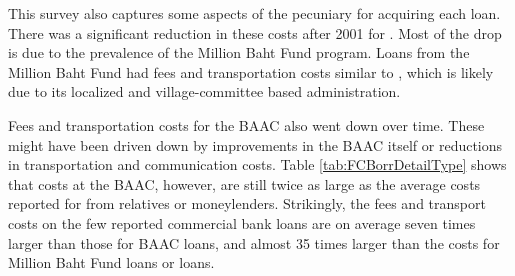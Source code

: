 \label{subsec:dataone}

This survey also captures some aspects of the pecuniary \FCFs for acquiring each loan. There was a significant reduction in these costs after 2001 for \NLC \BBBB. Most of the drop is due to the prevalence of the Million Baht Fund program. Loans from the Million Baht Fund had fees and transportation costs similar to \BBBB \LLCLY, which is likely due to its localized and village-committee based administration.

Fees and transportation costs for the BAAC also went down over time. These might have been driven down by improvements in the BAAC itself or reductions in transportation and communication costs. Table \ref{tab:FCBorrDetailType} shows that costs at the BAAC, however, are still twice as large as the average costs reported for \BBBB from relatives or moneylenders. Strikingly, the fees and transport costs on the few reported commercial bank loans are on average seven times larger than those for BAAC loans, and almost 35 times larger than the costs for Million Baht Fund loans or \LLC loans.
